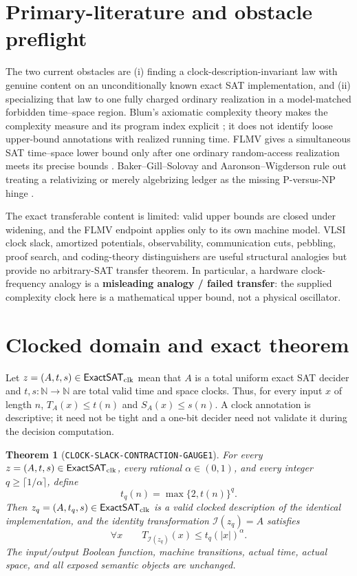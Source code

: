 \documentclass[11pt]{article}
\newtheorem{theorem}{Theorem}
\newcommand{\ExactSAT}{\mathsf{ExactSAT}_{\rm clk}}
\begin{document}
\section{Primary-literature and obstacle preflight}

The two current obstacles are (i) finding a clock-description-invariant law
with genuine content on an unconditionally known exact SAT implementation,
and (ii) specializing that law to one fully charged ordinary realization in
a model-matched forbidden time--space region.  Blum's axiomatic complexity
theory makes the complexity measure and its program index explicit
\cite{Blum67}; it does not identify loose upper-bound annotations with
realized running time.  FLMV gives a simultaneous SAT time--space lower bound
only after one ordinary random-access realization meets its precise bounds
\cite{FLMV05}.  Baker--Gill--Solovay and Aaronson--Wigderson rule out treating
a relativizing or merely algebrizing ledger as the missing P-versus-NP hinge
\cite{BGS75,AW09}.

The exact transferable content is limited: valid upper bounds are closed
under widening, and the FLMV endpoint applies only to its own machine model.
VLSI clock slack, amortized potentials, observability, communication cuts,
pebbling, proof search, and coding-theory distinguishers are useful
structural analogies but provide no arbitrary-SAT transfer theorem.  In
particular, a hardware clock-frequency analogy is a \textbf{misleading
analogy / failed transfer}: the supplied complexity clock here is a
mathematical upper bound, not a physical oscillator.

\section{Clocked domain and exact theorem}

Let $z=(A,t,s)\in\ExactSAT$ mean that $A$ is a total uniform exact SAT
decider and $t,s:\mathbb N\to\mathbb N$ are total valid time and space
clocks.  Thus, for every input $x$ of length $n$,
$T_A(x)\le t(n)$ and $S_A(x)\le s(n)$.  A clock annotation is descriptive;
it need not be tight and a one-bit decider need not validate it during the
decision computation.

\begin{theorem}[\texttt{CLOCK-SLACK-CONTRACTION-GAUGE1}]
For every $z=(A,t,s)\in\ExactSAT$, every rational
$\alpha\in(0,1)$, and every integer $q\ge\lceil 1/\alpha\rceil$, define
\[
 t_q(n)=\max\{2,t(n)\}^{q}. \tag{1}
\]
Then $z_q=(A,t_q,s)\in\ExactSAT$ is a valid clocked description of the
identical implementation, and the identity transformation
$\mathcal I(z_q)=A$ satisfies
\[
 \forall x\qquad
 T_{\mathcal I(z_q)}(x)\le t_q(|x|)^{\alpha}. \tag{2}
\]
The input/output Boolean function, machine transitions, actual time, actual
space, and all exposed semantic objects are unchanged.
\end{theorem}
\end{document}
